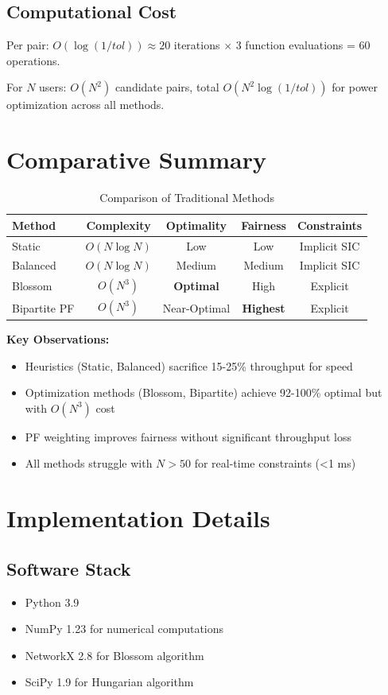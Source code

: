 \subsection{Computational Cost}

Per pair: $O(\log(1/tol)) \approx 20$ iterations × 3 function evaluations = 60 operations.

For $N$ users: $O(N^2)$ candidate pairs, total $O(N^2 \log(1/tol))$ for power optimization across all methods.

\section{Comparative Summary}

\begin{table}[H]
\centering
\caption{Comparison of Traditional Methods}
\label{tab:trad_methods}
\begin{tabular}{lcccc}
\toprule
\textbf{Method} & \textbf{Complexity} & \textbf{Optimality} & \textbf{Fairness} & \textbf{Constraints} \\
\midrule
Static & $O(N \log N)$ & Low & Low & Implicit SIC \\
Balanced & $O(N \log N)$ & Medium & Medium & Implicit SIC \\
Blossom & $O(N^3)$ & \textbf{Optimal} & High & Explicit \\
Bipartite PF & $O(N^3)$ & Near-Optimal & \textbf{Highest} & Explicit \\
\bottomrule
\end{tabular}
\end{table}

\textbf{Key Observations:}
\begin{itemize}
    \item Heuristics (Static, Balanced) sacrifice 15-25\% throughput for speed
    \item Optimization methods (Blossom, Bipartite) achieve 92-100\% optimal but with $O(N^3)$ cost
    \item PF weighting improves fairness without significant throughput loss
    \item All methods struggle with $N > 50$ for real-time constraints (<1 ms)
\end{itemize}

\section{Implementation Details}

\subsection{Software Stack}
\begin{itemize}
    \item Python 3.9
    \item NumPy 1.23 for numerical computations
    \item NetworkX 2.8 for Blossom algorithm
    \item SciPy 1.9 for Hungarian algorithm
\end{itemize}

